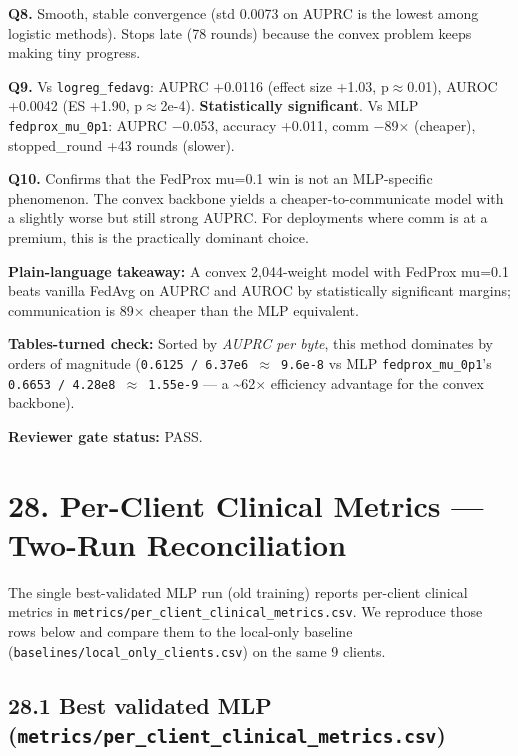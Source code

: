 \documentclass{article}
\begin{document}
\textbf{Q8.} Smooth, stable convergence (std 0.0073 on AUPRC is the lowest among logistic methods). Stops late (78 rounds) because the convex problem keeps making tiny progress.


\textbf{Q9.} Vs \texttt{logreg\_fedavg}: AUPRC +0.0116 (effect size +1.03, p\ensuremath{\approx}0.01), AUROC +0.0042 (ES +1.90, p\ensuremath{\approx}2e-4). \textbf{Statistically significant}. Vs MLP \texttt{fedprox\_mu\_0p1}: AUPRC \ensuremath{-}0.053, accuracy +0.011, comm \ensuremath{-}89\ensuremath{\times} (cheaper), stopped\_round +43 rounds (slower).


\textbf{Q10.} Confirms that the FedProx mu=0.1 win is not an MLP-specific phenomenon. The convex backbone yields a cheaper-to-communicate model with a slightly worse but still strong AUPRC. For deployments where comm is at a premium, this is the practically dominant choice.


\textbf{Plain-language takeaway:} A convex 2,044-weight model with FedProx mu=0.1 beats vanilla FedAvg on AUPRC and AUROC by statistically significant margins; communication is 89\ensuremath{\times} cheaper than the MLP equivalent.


\textbf{Tables-turned check:} Sorted by \emph{AUPRC per byte}, this method dominates by orders of magnitude (\texttt{0.6125 / 6.37e6 \ensuremath{\approx} 9.6e-8} vs MLP \texttt{fedprox\_mu\_0p1}'s \texttt{0.6653 / 4.28e8 \ensuremath{\approx} 1.55e-9} --- a \textasciitilde{}62\ensuremath{\times} efficiency advantage for the convex backbone).


\textbf{Reviewer gate status:} PASS.



\clearpage
\section{28. Per-Client Clinical Metrics --- Two-Run Reconciliation}


The single best-validated MLP run (old training) reports per-client clinical metrics in \texttt{metrics/per\_client\_clinical\_metrics.csv}. We reproduce those rows below and compare them to the local-only baseline (\texttt{baselines/local\_only\_clients.csv}) on the same 9 clients.


\subsection{28.1 Best validated MLP (\texttt{metrics/per\_client\_clinical\_metrics.csv})}
\end{document}
